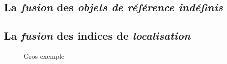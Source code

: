 \subsection{La \emph{fusion} des \emph{objets de référence indéfinis}}

\subsection{La \emph{fusion} des indices de \emph{localisation}}


\begin{landscape}
  \begin{figure}[H]
    \centering
    
    \caption{Gros exemple}
    \label{fig:exemple_final_fusion}
  \end{figure}
\end{landscape}


